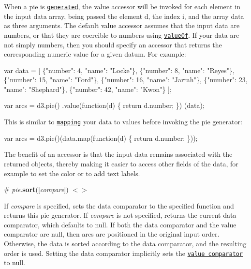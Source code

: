 When a pie is \href{#_pie}{\tt generated}, the value accessor will be invoked for each element in the input data array, being passed the element {\ttfamily d}, the index {\ttfamily i}, and the array {\ttfamily data} as three arguments. The default value accessor assumes that the input data are numbers, or that they are coercible to numbers using \href{https://developer.mozilla.org/en-US/docs/Web/JavaScript/Reference/Global_Objects/Object/valueOf}{\tt value\+Of}. If your data are not simply numbers, then you should specify an accessor that returns the corresponding numeric value for a given datum. For example\+:


\begin{DoxyCode}
var data = [
  \{"number":  4, "name": "Locke"\},
  \{"number":  8, "name": "Reyes"\},
  \{"number": 15, "name": "Ford"\},
  \{"number": 16, "name": "Jarrah"\},
  \{"number": 23, "name": "Shephard"\},
  \{"number": 42, "name": "Kwon"\}
];

var arcs = d3.pie()
    .value(function(d) \{ return d.number; \})
    (data);
\end{DoxyCode}


This is similar to \href{https://developer.mozilla.org/en-US/docs/Web/JavaScript/Reference/Global_Objects/Array/map}{\tt mapping} your data to values before invoking the pie generator\+:


\begin{DoxyCode}
var arcs = d3.pie()(data.map(function(d) \{ return d.number; \}));
\end{DoxyCode}


The benefit of an accessor is that the input data remains associated with the returned objects, thereby making it easier to access other fields of the data, for example to set the color or to add text labels.

\label{_pie_sort}%
\# {\itshape pie}.{\bfseries sort}(\mbox{[}{\itshape compare}\mbox{]}) \href{https://github.com/d3/d3-shape/blob/master/src/pie.js#L62}{\tt $<$$>$}

If {\itshape compare} is specified, sets the data comparator to the specified function and returns this pie generator. If {\itshape compare} is not specified, returns the current data comparator, which defaults to null. If both the data comparator and the value comparator are null, then arcs are positioned in the original input order. Otherwise, the data is sorted according to the data comparator, and the resulting order is used. Setting the data comparator implicitly sets the \href{#pie_sortValues}{\tt value comparator} to null.

